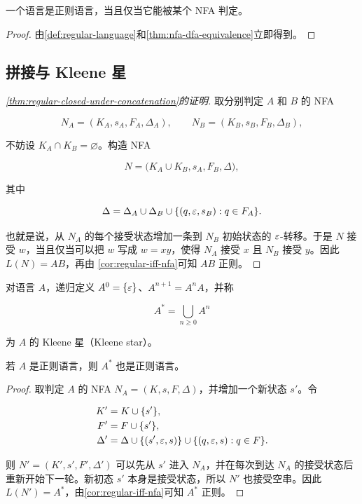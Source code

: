 \begin{corollary}
  \label{cor:regular-iff-nfa}
  一个语言是正则语言，当且仅当它能被某个 NFA 判定。
\end{corollary}

\begin{proof}
  由\cref{def:regular-language}和\cref{thm:nfa-dfa-equivalence}立即得到。
\end{proof}

\subsection{拼接与 Kleene 星}

\begin{proof}[\cref{thm:regular-closed-under-concatenation}的证明]
  取分别判定 $A$ 和 $B$ 的 NFA

  \[
    N_A=(K_A,s_A,F_A,\Delta_A),
    \qquad
    N_B=(K_B,s_B,F_B,\Delta_B),
  \]

  不妨设 $K_A\cap K_B=\varnothing$。构造 NFA

  \[
    N=\bigl(K_A\cup K_B,s_A,F_B,\Delta\bigr),
  \]

  其中

  \[
    \Delta=\Delta_A\cup\Delta_B
      \cup\{(q,\varepsilon,s_B):q\in F_A\}.
  \]

  也就是说，从 $N_A$ 的每个接受状态增加一条到 $N_B$ 初始状态的
  $\varepsilon$-转移。于是 $N$ 接受 $w$，当且仅当可以把 $w$ 写成 $w=xy$，使得
  $N_A$ 接受 $x$ 且 $N_B$ 接受 $y$。因此 $L(N)=AB$，再由
  \cref{cor:regular-iff-nfa}可知 $AB$ 正则。
\end{proof}

对语言 $A$，递归定义 $A^0=\{\varepsilon\}$、$A^{n+1}=A^nA$，并称

\[
  A^*=\bigcup_{n\geq0}A^n
\]

为 $A$ 的 Kleene 星（Kleene star）。

\begin{theorem}
  \label{thm:regular-closed-under-star}
  若 $A$ 是正则语言，则 $A^*$ 也是正则语言。
\end{theorem}

\begin{proof}
  取判定 $A$ 的 NFA $N_A=(K,s,F,\Delta)$，并增加一个新状态 $s'$。令

  \begin{align*}
    K'&=K\cup\{s'\},\\
    F'&=F\cup\{s'\},\\
    \Delta'&=\Delta\cup\{(s',\varepsilon,s)\}
      \cup\{(q,\varepsilon,s):q\in F\}.
  \end{align*}

  则 $N'=(K',s',F',\Delta')$ 可以先从 $s'$ 进入 $N_A$，并在每次到达
  $N_A$ 的接受状态后重新开始下一轮。新初态 $s'$ 本身是接受状态，所以
  $N'$ 也接受空串。因此 $L(N')=A^*$，由\cref{cor:regular-iff-nfa}可知
  $A^*$ 正则。
\end{proof}

